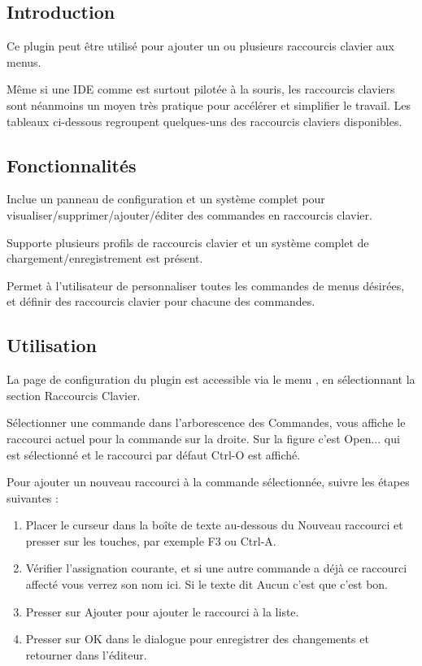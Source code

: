 \subsection{Introduction}

Ce plugin peut être utilisé pour ajouter un ou plusieurs raccourcis clavier aux menus.

Même si une IDE comme \codeblocks est surtout pilotée à la souris, les raccourcis claviers sont néanmoins un moyen très pratique pour accélérer et simplifier le travail. Les tableaux ci-dessous regroupent quelques-uns des raccourcis claviers disponibles.

\subsection{Fonctionnalités}
\begin{description}
\item Inclue un panneau de configuration et un système complet pour visualiser/supprimer/ajouter/éditer des commandes en raccourcis clavier.
\item Supporte plusieurs profils de raccourcis clavier et un système complet de chargement/enregistrement est présent.
\item Permet à l'utilisateur de personnaliser toutes les commandes de menus désirées, et définir des raccourcis clavier pour chacune des commandes.
\end{description}

\subsection{Utilisation}

La page de configuration du plugin est accessible via le menu , en sélectionnant la section Raccourcis Clavier.


Sélectionner une commande dans l'arborescence des Commandes, vous affiche le raccourci actuel pour la commande sur la droite. Sur la figure c'est Open... qui est sélectionné et le raccourci par défaut Ctrl-O est affiché.

Pour ajouter un nouveau raccourci à la commande sélectionnée, suivre les étapes suivantes :

\begin{enumerate}
\item Placer le curseur dans la boîte de texte au-dessous du Nouveau raccourci et presser sur les touches, par exemple F3 ou Ctrl-A.
\item Vérifier l'assignation courante, et si une autre commande a déjà ce raccourci affecté vous verrez son nom ici. Si le texte dit Aucun c'est que c'est bon.
\item Presser sur Ajouter pour ajouter le raccourci à la liste.
\item Presser sur OK dans le dialogue pour enregistrer des changements et retourner dans l'éditeur.
\end{enumerate}




